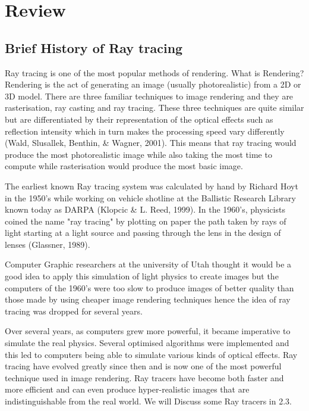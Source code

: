 \documentclass[a4paper]{report}
\begin{document}
	\chapter{Review}
	\section{Brief History of Ray tracing}
	
	\par Ray tracing is one of the most popular methods of rendering. What is Rendering? Rendering is the act of generating an image (usually photorealistic) from a 2D or 3D model. There are three familiar techniques to image rendering and they are rasterisation, ray casting and ray tracing. These three techniques are quite similar but are differentiated by their representation of the optical effects such as reflection intensity which in turn makes the processing speed vary differently (Wald, Slusallek, Benthin, \& Wagner, 2001). This means that ray tracing would produce the most photorealistic image while also taking the most time to compute while rasterisation would produce the most basic image.\\
	
	\par The earliest known Ray tracing system was calculated by hand by Richard Hoyt in the 1950's while working on vehicle shotline at the Ballistic Research Library known today as DARPA (Klopcic \& L. Reed, 1999). In the 1960's, physicists coined the name "ray tracing" by plotting on paper the path taken by rays of light starting at a light source and passing through the lens in the design of lenses (Glassner, 1989).\\
	
	\par Computer Graphic researchers at the university of Utah thought it would be a good idea to apply this simulation of light physics to create images but the computers of the 1960's were too slow to produce images of better quality than those made by using cheaper image rendering techniques hence the idea of ray tracing was dropped for several years.\\
	
	\par Over several years, as computers grew more powerful, it became imperative to simulate the real physics. Several optimised algorithms were implemented and this led to computers being able to simulate various kinds of optical effects. Ray tracing have evolved greatly since then and is now one of the most powerful technique used in image rendering. Ray tracers have become both faster and more efficient and can even produce hyper-realistic images that are indistinguishable from the real world. We will Discuss some Ray tracers in 2.3.\\
	
\end{document}
